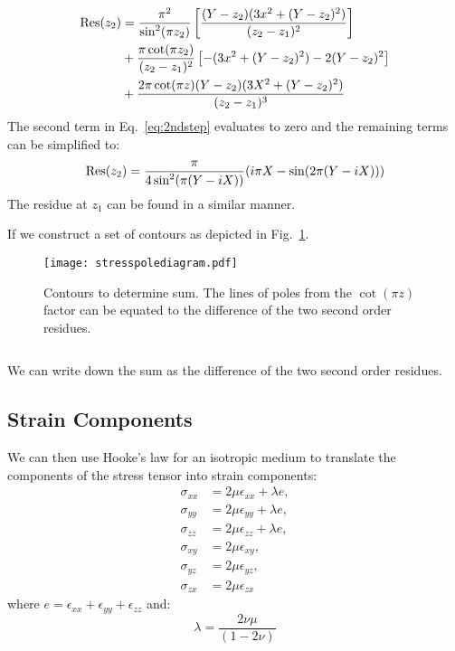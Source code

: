 \documentclass{article}
\begin{document}
\begin{align}
\label{eq:2ndstep}
{\rm Res}(z_{2})&=\frac{\pi^{2}}{\sin^{2}(\pi z_{2})}\left[\frac{(Y-z_{2})(3x^{2}+(Y-z_{2})^{2})}{(z_{2}-z_{1})^{2}}\right]\\
  &+\frac{\pi\cot(\pi z_{2})}{(z_{2}-z_{1})^{2}}\left[-(3x^{2} + (Y-z_{2})^{2})-2(Y-z_{2})^{2}\right] \\
  &+\frac{2\pi\cot(\pi z)(Y-z_{2})(3X^{2}+(Y-z_{2})^{2})}{(z_{2} - z_{1})^{3}}
\end{align}
%
The second term in Eq.~\ref{eq:2ndstep} evaluates to zero and the remaining terms can be simplified to:
%
\begin{equation}
{\rm Res}(z_{2}) = \frac{\pi}{4\sin^{2}(\pi(Y-iX))}(i\pi X - \sin(2\pi(Y-iX)))
\end{equation}
%
The residue at $z_{1}$ can be found in a similar manner.

If we construct a set of contours as depicted in Fig.~\ref{fig:polediagram}.
\begin{figure}[!tbp]
\begin{center}
\texttt{[image: stresspolediagram.pdf]}
\caption{Contours to determine sum. The lines of poles from the $\cot(\pi z)$ 
factor can be equated to the difference of the two 
second order residues.\label{fig:polediagram}}
\end{center}
\end{figure}

\begin{equation}

\end{equation}

We can write down the sum as the difference of the two second order residues.

\subsection{Strain Components}
We can then use Hooke's law for an isotropic medium to translate the
components of the stress tensor into strain components:
%
\begin{align*}
\sigma_{xx} &= 2\mu \epsilon_{xx}+\lambda e,\\
\sigma_{yy} &= 2\mu \epsilon_{yy}+\lambda e,\\
\sigma_{zz} &= 2\mu \epsilon_{zz}+\lambda e,\\
\sigma_{xy} &= 2\mu \epsilon_{xy},\\
\sigma_{yz} &= 2\mu \epsilon_{yz},\\
\sigma_{zx} &= 2\mu \epsilon_{zx}
\end{align*}
%
where $e=\epsilon_{xx}+\epsilon_{yy}+\epsilon_{zz}$ and:
%
\begin{equation}
\lambda = \frac{2\nu\mu}{(1-2\nu)}
\end{equation}
%
\end{document}
